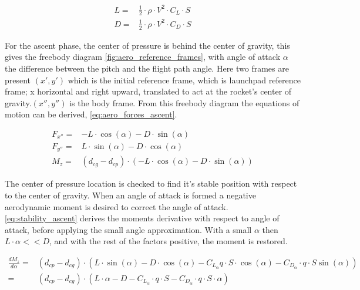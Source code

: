 \begin{equation}
\begin{aligned}
    L =& \frac{1}{2} \cdot \rho \cdot V^2 \cdot C_L \cdot S \\
    D =& \frac{1}{2} \cdot \rho \cdot V^2 \cdot C_D \cdot S
\end{aligned}
\label{eq:lift_drag}
\end{equation}

For the ascent phase, the center of pressure is behind the center of gravity, this gives the freebody diagram \autoref{fig:aero_reference_frames}, with angle of attack $\alpha$ the difference between the pitch and the flight path angle. Here two frames are present $(x',y')$ which is the initial reference frame, which is launchpad reference frame; x horizontal and right upward, translated to act at the rocket's center of gravity.$(x'',y'')$ is the body frame. From this freebody diagram the equations of motion can be derived, \autoref{eq:aero_forces_ascent}.

\begin{equation}
\begin{aligned}
    F_{x''} =& -L \cdot \cos(\alpha) -D\cdot\sin(\alpha) \\
    F_{y''} =& L \cdot \sin(\alpha) - D \cdot \cos(\alpha) \\
    M_z =& (d_{cg} - d_{cp}) \cdot ( -L \cdot \cos(\alpha) -D\cdot\sin(\alpha))
\end{aligned}
\label{eq:aero_forces_ascent}
\end{equation}

The center of pressure location is checked to find it's stable position with respect to the center of gravity. When an angle of attack is formed a negative aerodynamic moment is desired to correct the angle of attack. \autoref{eq:stability_ascent} derives the moments derivative with respect to angle of attack, before applying the small angle approximation. With a small $\alpha$ then $L\cdot \alpha << D$, and with the rest of the factors positive, the moment is restored.

\begin{equation}
\begin{aligned}
    \frac{dM_z}{d\alpha} =& (d_{cp} - d_{cg}) \cdot (L \cdot \sin(\alpha) -D \cdot \cos(\alpha) - C_{L_\alpha} q \cdot S\cdot \cos(\alpha) - C_{D_\alpha} \cdot q \cdot S \sin(\alpha)) \\
    =& (d_{cp} - d_{cg}) \cdot (L \cdot \alpha - D - C_{L_\alpha}\cdot q \cdot S - C_{D_\alpha} \cdot q \cdot S \cdot \alpha)
\end{aligned}
\label{eq:stability_ascent}
\end{equation}

